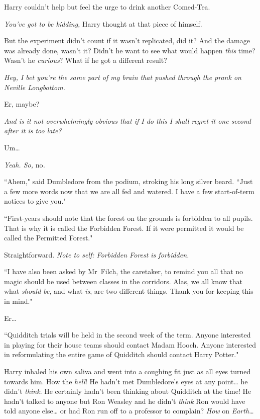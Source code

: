 Harry couldn't help but feel the urge to drink another Comed-Tea.

\emph{You've \emph{got} to be kidding,} Harry thought at that piece of himself.

But the experiment didn't count if it wasn't replicated, did it? And the damage was already done, wasn't it? Didn't he want to see what would happen \emph{this} time? Wasn't he \emph{curious}? What if he got a different result?

\emph{Hey, I bet you're the same part of my brain that pushed through the prank on Neville Longbottom.}

Er, maybe?

\emph{And is it not \emph{overwhelmingly} obvious that if I do this I shall regret it one second after it is too late?}

Um{\ldots}

\emph{Yeah. So,} no\emph{.}

``Ahem," said Dumbledore from the podium, stroking his long silver beard. ``Just a few more words now that we are all fed and watered. I have a few start-of-term notices to give you."

``First-years should note that the forest on the grounds is forbidden to all pupils. That is why it is called the Forbidden Forest. If it were permitted it would be called the Permitted Forest."

Straightforward. \emph{Note to self: Forbidden Forest is forbidden.}

``I have also been asked by Mr~Filch, the caretaker, to remind you all that no magic should be used between classes in the corridors. Alas, we all know that what \emph{should be}, and what \emph{is}, are two different things. Thank you for keeping this in mind."

Er{\ldots}

``Quidditch trials will be held in the second week of the term. Anyone interested in playing for their house teams should contact Madam Hooch. Anyone interested in reformulating the entire game of Quidditch should contact Harry Potter."

Harry inhaled his own saliva and went into a coughing fit just as all eyes turned towards him. How the \emph{hell}! He hadn't met Dumbledore's eyes at any point{\ldots} he didn't \emph{think}. He certainly hadn't been thinking about Quidditch at the time! He hadn't talked to anyone but Ron Weasley and he didn't \emph{think} Ron would have told anyone else{\ldots} or had Ron run off to a professor to complain? \emph{How} on \emph{Earth{\ldots}}

